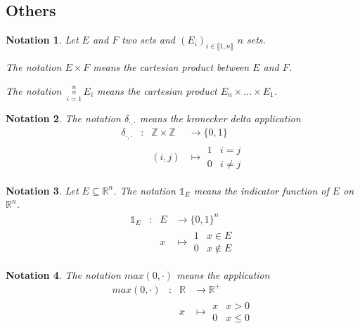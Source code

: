 \documentclass[11pt,en]{elegantpaper}
\newtheorem{notation}{Notation}
\newcommand{\Real}{\mathbb{R}}
\begin{document}
\subsection{Others}

\begin{notation}
  Let $E$ and $F$ two sets and $(E_i)_{i \in \llbracket 1,n \rrbracket}$ $n$ sets. \par
  The notation $E \times F$ means the cartesian product between $E$ and $F$. \par
  The notation $\underset{i=1}{\overset{n}\circ} E_i$ means the cartesian product $E_n \times \ldots \times E_1$.
\end{notation}

\begin{notation}
  The notation $\delta_{\cdot,\cdot}$ means the kronecker delta application \begin{equation*}
    \begin{array}{llll}
      \delta_{\cdot,\cdot} & : & \mathbb{Z} \times \mathbb{Z} & \longrightarrow \{0,1\} \\
      &   & (i,j) & \longmapsto \begin{array}{ll}
        1 & i = j \\
        0 & i \neq j
      \end{array}
    \end{array}
  \end{equation*}
\end{notation}

\begin{notation}
  Let $E \subseteq \Real^n$. The notation $\mathbb{1}_E$ means the indicator function of $E$ on $\Real^n$.
  \begin{equation*}
    \begin{array}{llll}
      \mathbb{1}_E & : & E & \longrightarrow \{0,1\}^n \\
      &   & x & \longmapsto \begin{array}{ll}
        1 & x \in E \\
        0 & x \notin E
      \end{array}
    \end{array}
  \end{equation*}
\end{notation}

\begin{notation}
  The notation $max(0,\cdot)$ means the application
  \begin{equation*}
    \begin{array}{llll}
      max(0,\cdot) & : & \Real & \longrightarrow \Real^+ \\
      &   & x & \longmapsto \begin{array}{ll}
        x & x > 0 \\
        0 & x \leq 0
      \end{array}
    \end{array}
  \end{equation*}
\end{notation}
\end{document}
